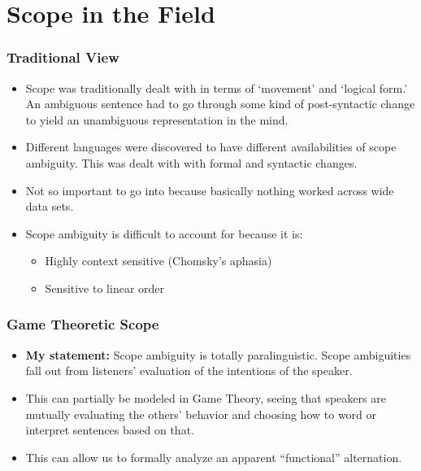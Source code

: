 \documentclass[aspectratio=1610]{beamer}
\begin{document}
\section{Scope in the Field}

\begin{frame}
\frametitle{Traditional View}\pause
\begin{itemize}
\item Scope was traditionally dealt with in terms of `movement' and `logical form.' An ambiguous sentence had to go through some kind of post-syntactic change to yield an unambiguous representation in the mind.\pause
\item Different languages were discovered to have different availabilities of scope ambiguity. This was dealt with with formal and syntactic changes.\pause
\item Not so important to go into because basically nothing worked across wide data sets.\pause
\item Scope ambiguity is difficult to account for because it is:\pause
\begin{itemize}
\item Highly context sensitive (Chomsky's aphasia)\pause
\item Sensitive to linear order
\end{itemize}
\end{itemize}
\end{frame}

\begin{frame}
\frametitle{Game Theoretic Scope}\pause
\begin{itemize}
\item \textbf{My statement:} Scope ambiguity is totally paralinguistic. Scope ambiguities fall out from listeners' evaluation of the intentions of the speaker.\pause
\item This can partially be modeled in Game Theory, seeing that speakers are mutually evaluating the others' behavior and choosing how to word or interpret sentences based on that.\pause
\item This can allow us to formally analyze an apparent ``functional'' alternation.
\end{itemize}
\end{frame}
\end{document}
